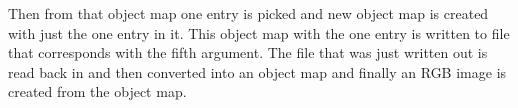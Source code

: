 \documentclass{InsightArticle}
\begin{document}
Then from that object map one entry is picked and new object map is created with just the one entry in it.  This object map with the one entry is written to file that corresponds with the fifth argument.  The file that was just written out is read back in and then converted into an object map and finally an RGB image is created from the object map.



%
%



\end{document}
